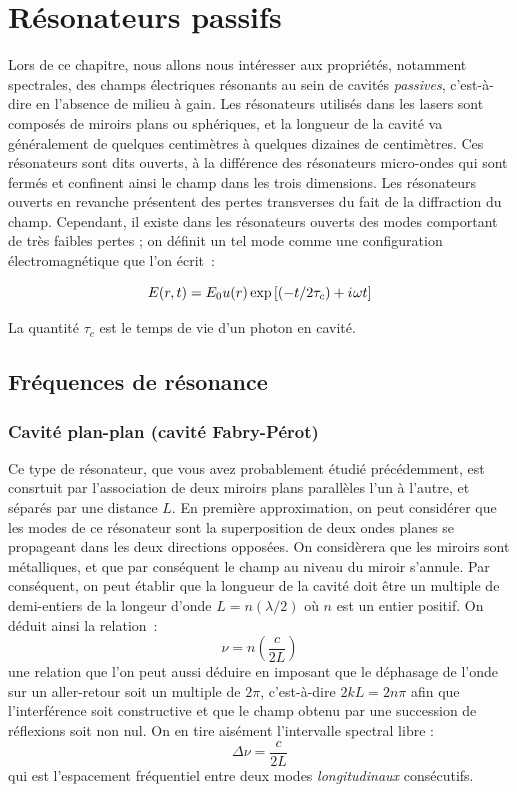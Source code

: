 \documentclass[a4paper]{book}
\newcommand{\iu}{{i\mkern1mu}}
\begin{document}
\medskip


\chapter{Résonateurs passifs}

Lors de ce chapitre, nous allons nous intéresser aux propriétés, notamment spectrales, des champs électriques résonants au sein de cavités \textit{passives}, c'est-à-dire en l'absence de milieu à gain. 
Les résonateurs utilisés dans les lasers sont composés de miroirs plans ou sphériques, et la longueur de la cavité va généralement de quelques centimètres à quelques dizaines de centimètres. 
Ces résonateurs sont dits ouverts, à la différence des résonateurs micro-ondes qui sont fermés et confinent ainsi le champ dans les trois dimensions. Les résonateurs ouverts en revanche présentent des pertes transverses du fait de la diffraction du champ. Cependant, il existe dans les résonateurs ouverts des modes comportant de très faibles pertes ; on définit un tel mode comme une configuration électromagnétique que l'on écrit~:

\begin{equation}
    E(r,t)=E_0u(r)\exp\left[(-t/2\tau_c)+\iu \omega t\right]
\end{equation}

La quantité $\tau_c$ est le temps de vie d'un photon en cavité.

\section{Fréquences de résonance}

\subsection{Cavité plan-plan (cavité Fabry-Pérot)}
Ce type de résonateur, que vous avez probablement étudié précédemment, est consrtuit par l'association de deux miroirs plans parallèles l'un à l'autre, et séparés par une distance $L$. En première approximation, on peut considérer que les modes de ce résonateur sont la superposition de deux ondes planes se propageant dans les deux directions opposées. On considèrera que les miroirs sont métalliques, et que par conséquent le champ au niveau du miroir s'annule. Par conséquent, on peut établir que la longueur de la cavité doit être un multiple de demi-entiers de la longeur d'onde $L = n(\lambda/2)$ où $n$ est un entier positif. On déduit ainsi la relation~:
\begin{equation}
    \nu = n\left(\frac{c}{2L}\right)
    \label{eq:FP}
\end{equation}
une relation que l'on peut aussi déduire en imposant que le déphasage de l'onde sur un aller-retour soit un multiple de $2\pi$, c'est-à-dire $2kL=2n\pi$ afin que l'interférence soit constructive et que le champ obtenu par une succession de réflexions soit non nul. 
On en tire aisément l'intervalle spectral libre : 
\begin{equation}
    \Delta\nu = \frac{c}{2L}
\end{equation}
qui est l'espacement fréquentiel entre deux modes \textit{longitudinaux} consécutifs.
\end{document}

